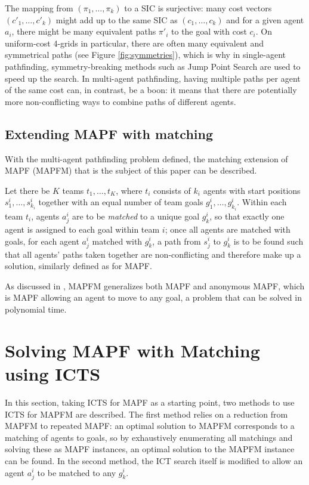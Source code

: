 \documentclass[english]{article}
\begin{document}
	
	The mapping from $(\pi_1,\ldots,\pi_k)$ to a SIC is surjective: many cost vectors $(c'_1,\ldots,c'_k)$ might add up to the same SIC as $(c_1,\ldots,c_k)$ and for a given agent $a_i$, there might be many equivalent paths $\pi'_i$ to the goal with cost $c_i$. On uniform-cost 4-grids in particular, there are often many equivalent and symmetrical paths \cite{harabor2010} (see Figure \ref{fig:symmetries}), which is why in single-agent pathfinding, symmetry-breaking methods such as Jump Point Search \cite{harabor2011} are used to speed up the search. In multi-agent pathfinding, having multiple paths per agent of the same cost can, in contrast, be a boon: it means that there are potentially more non-conflicting ways to combine paths of different agents.
	
	\subsection{Extending MAPF with matching}
	With the multi-agent pathfinding problem defined, the matching extension of MAPF (MAPFM) that is the subject of this paper can be described.
	
	Let there be $K$ teams $t_1,\ldots, t_K$, where $t_i$ consists of $k_i$ agents with start positions $s_1^i,\ldots,s_{k_i}^i$ together with an equal number of team goals $g_1^i,\ldots,g_{k_i}^i$. Within each team $t_i$, agents $a_j^i$ are to be \textit{matched} to a unique goal $g_k^i$, so that exactly one agent is assigned to each goal within team $i$; once all agents are matched with goals, for each agent $a_j^i$ matched with $g_k^i$, a path from $s_j^i$ to $g_k^i$ is to be found such that all agents' paths taken together are non-conflicting and therefore make up a solution, similarly defined as for MAPF.
	
	As discussed in \cite{ma2016}, MAPFM generalizes both MAPF and anonymous MAPF, which is MAPF allowing an agent to move to any goal, a problem that can be solved in polynomial time.
	\section{Solving MAPF with Matching using ICTS} %
	\label{section:icts-matching}
	In this section, taking ICTS for MAPF as a starting point, two methods to use ICTS for MAPFM are described. The first method relies on a reduction from MAPFM to repeated MAPF: an optimal solution to MAPFM corresponds to a matching of agents to goals, so by exhaustively enumerating all matchings and solving these as MAPF instances, an optimal solution to the MAPFM instance can be found. In the second method, the ICT search itself is modified to allow an agent $a_j^i$ to be matched to any $g_k^i$.
\end{document}
